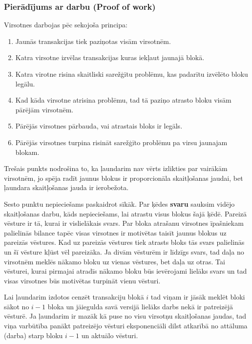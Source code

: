 \subsubsection{Pierādījums ar darbu (Proof of work)}
Virsotnes darbojas pēc sekojoša principa:\cite{nakamoto08}
\begin{enumerate}
    \item Jaunās transakcijas tiek paziņotas visām virsotnēm.
    \item Katra virsotne izvēlas transakcijas kuras iekļaut jaunajā blokā.
    \item Katra virotne risina skaitliski sarežģītu problēmu, kas padarītu izvēlēto bloku legālu.
    \item Kad kāda virsotne atrisina problēmu, tad tā paziņo atrasto bloku visām pārējām virsotnēm.
    \item Pārējās virsotnes pārbauda, vai atrastais bloks ir legāls.
    \item Pārējās virsotnes turpina risināt sarežģīto problēmu pa virsu jaunajam blokam.
\end{enumerate}
Trešais punkts nodrošina to, ka ļaundarim nav vērts izlikties par vairākām virsotnēm, jo spēja radīt jaunus blokus ir proporcionāla skaitļošanas jaudai, bet ļaundara skaitļošanas jauda ir ierobežota.

Sesto punktu nepieciešams paskaidrot sīkāk. Par ķēdes \textbf{svaru} sauksim vidējo skaitļošanas darbu, kāds nepieciešams, lai atrastu visus blokus šajā ķēdē. Pareizā vēsture ir tā, kurai ir vislielākais svars. Par bloka atrašanu virsotnes īpašniekam palielinās bilance tapēc visas virsotnes ir motivētas taisīt jaunus blokus uz pareizās vēstures. Kad uz pareizās vēstures tiek atrasts bloks tās svars palielinās un šī vēsture kļūst vēl pareizāka. Ja divām vēsturēm ir līdzīgs svars, tad daļa no virsotnēm meklēs nākamo bloku uz vienas vēstures, bet daļa uz otras. Tai vēsturei, kurai pirmajai atradīs nākamo bloku būs ievērojami lielāks svars un tad visas virsotnes būs motivētas turpināt vienu vēsturi.

Lai ļaundarim izdotos cenzēt transakciju blokā $i$ tad viņam ir jāsāk meklēt bloki sākot no $i-1$ bloka un jāiegulda savā versijā lielāks darbs nekā ir patreizējā vēsturē. Ja ļaundarim ir mazāk kā puse no visu virsotņu skaitļošanas jaudas, tad viņa varbūtība panākt patreizējo vēsturi eksponenciāli dilst atkarībā no attāluma (darba) starp bloku $i-1$ un aktuālo vēsturi.\cite{nakamoto08}

